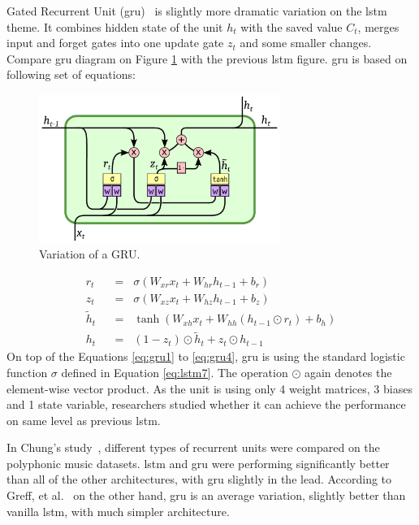 Gated Recurrent Unit (\gls{gru})~\cite{DBLP:journals/corr/ChoMGBSB14} is slightly more dramatic variation on the \gls{lstm} theme. It combines hidden state of the unit $ h_t $ with the saved value $ C_t $, merges input and forget gates into one update gate $ z_t $ and some smaller changes. Compare \gls{gru} diagram on Figure \ref{fig:gru} with the previous \gls{lstm} figure. \gls{gru} is based on following set of equations:
\begin{figure}[!t]
	\centering
	\includegraphics[width=0.7\textwidth]{./fig/gru.pdf}
	\caption{Variation of a GRU.
		\label{fig:gru}}
\end{figure}
\begin{align}
r_t \hspace{7pt}&=\hspace{7pt} \sigma(W_{xr}x_t + W_{hr}h_{t-1} + b_r) \label{eq:gru1}\\
z_t \hspace{7pt}&=\hspace{7pt} \sigma(W_{xz}x_t + W_{hz}h_{t-1} + b_z) \label{eq:gru2}\\
\widetilde{h}_t \hspace{7pt}&=\hspace{7pt} \tanh(W_{xh}x_t + W_{hh}(h_{t-1}\odot r_t) + b_h) \label{eq:gru3}\\
h_t \hspace{7pt}&=\hspace{7pt} (1-z_t)\odot \widetilde{h}_t + z_t\odot h_{t-1} \label{eq:gru4}
\end{align}
On top of the Equations \eqref{eq:gru1} to \eqref{eq:gru4}, \gls{gru} is using the standard logistic function $ \sigma $ defined in Equation \eqref{eq:lstm7}. The operation $ \odot $ again denotes the element-wise vector product. As the unit is using only 4 weight matrices, 3 biases and 1 state variable, researchers studied whether it can achieve the performance on same level as previous \gls{lstm}.

In Chung's study~\cite{DBLP:journals/corr/ChungGCB14}, different types of recurrent units were compared on the polyphonic music datasets. \gls{lstm} and \gls{gru} were performing significantly better than all of the other architectures, with \gls{gru} slightly in the lead. According to Greff, et al.~\cite{DBLP:journals/corr/GreffSKSS15} on the other hand, \gls{gru} is an average variation, slightly better than vanilla \gls{lstm}, with much simpler architecture.

